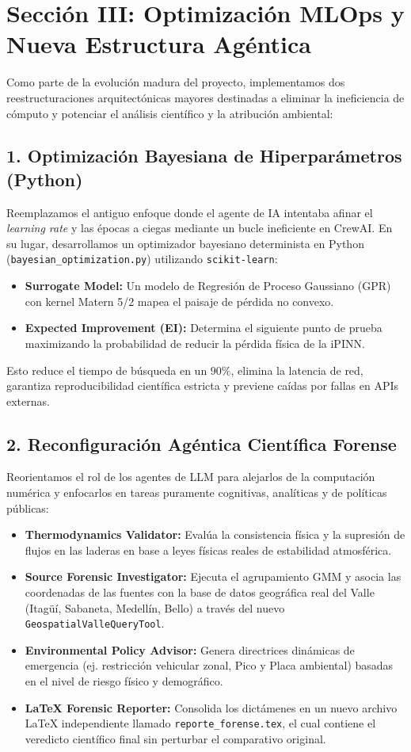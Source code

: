 \documentclass[11pt,a4paper]{article}
\begin{document}
\section*{Sección III: Optimización MLOps y Nueva Estructura Agéntica}
Como parte de la evolución madura del proyecto, implementamos dos reestructuraciones arquitectónicas mayores destinadas a eliminar la ineficiencia de cómputo y potenciar el análisis científico y la atribución ambiental:

\subsection{1. Optimización Bayesiana de Hiperparámetros (Python)}
Reemplazamos el antiguo enfoque donde el agente de IA intentaba afinar el \textit{learning rate} y las épocas a ciegas mediante un bucle ineficiente en CrewAI. En su lugar, desarrollamos un optimizador bayesiano determinista en Python (\texttt{bayesian\_optimization.py}) utilizando \texttt{scikit-learn}:
\begin{itemize}
    \item \textbf{Surrogate Model:} Un modelo de Regresión de Proceso Gaussiano (GPR) con kernel Matern 5/2 mapea el paisaje de pérdida no convexo.
    \item \textbf{Expected Improvement (EI):} Determina el siguiente punto de prueba maximizando la probabilidad de reducir la pérdida física de la iPINN.
\end{itemize}
Esto reduce el tiempo de búsqueda en un $90\%$, elimina la latencia de red, garantiza reproducibilidad científica estricta y previene caídas por fallas en APIs externas.

\subsection{2. Reconfiguración Agéntica Científica Forense}
Reorientamos el rol de los agentes de LLM para alejarlos de la computación numérica y enfocarlos en tareas puramente cognitivas, analíticas y de políticas públicas:
\begin{itemize}
    \item \textbf{Thermodynamics Validator:} Evalúa la consistencia física y la supresión de flujos en las laderas en base a leyes físicas reales de estabilidad atmosférica.
    \item \textbf{Source Forensic Investigator:} Ejecuta el agrupamiento GMM y asocia las coordenadas de las fuentes con la base de datos geográfica real del Valle (Itagüí, Sabaneta, Medellín, Bello) a través del nuevo \texttt{GeospatialValleQueryTool}.
    \item \textbf{Environmental Policy Advisor:} Genera directrices dinámicas de emergencia (ej. restricción vehicular zonal, Pico y Placa ambiental) basadas en el nivel de riesgo físico y demográfico.
    \item \textbf{LaTeX Forensic Reporter:} Consolida los dictámenes en un nuevo archivo LaTeX independiente llamado \texttt{reporte\_forense.tex}, el cual contiene el veredicto científico final sin perturbar el comparativo original.
\end{itemize}
\end{document}

